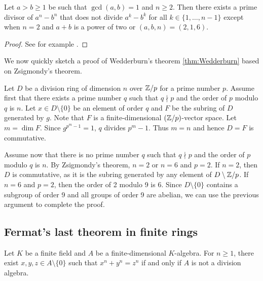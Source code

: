 
\begin{theorem}[Zsigmondy]
    Let $a>b\geq1$ be such that $\gcd(a,b)=1$ and $n\geq2$. 
    Then there exists a prime divisor of $a^n-b^n$ that does not
    divide $a^k-b^k$ for all $k\in\{1,\dots,n-1\}$ except 
    when $n=2$ and $a+b$ is a power of two or $(a,b,n)=(2,1,6)$. 
\end{theorem}


\begin{proof}
    See for example \cite{MR3172590}. 
\end{proof}

We now quickly sketch a proof of Wedderburn's theorem \ref{thm:Wedderburn} 
based on Zsigmondy's theorem.  

Let $D$ be a division ring of dimension $n$ over $\mathbb{Z}/p$ for a prime
number $p$. Assume 
first that there exists a prime number $q$ such that 
$q\nmid p$ and the order of $p$ modulo $q$ is $n$. Let $x\in D\setminus\{0\}$ be an element of order $q$ and $F$ be the subring
of $D$ generated by $g$. Note that $F$ is a finite-dimensional
$(\mathbb{Z}/p)$-vector space. Let $m=\dim F$. 
Since $g^{p^m-1}=1$, $q$ divides $p^m-1$. Thus $m=n$ and
hence $D=F$ is commutative. 

Assume now that there is no prime number $q$ such that 
$q\nmid p$ and the order of $p$ modulo $q$ is $n$. By Zsigmondy's 
theorem, $n=2$ or $n=6$ and $p=2$. If $n=2$, then 
$D$ is commutative, as it is the subring generated by
any element of $D\setminus \mathbb{Z}/p$. If $n=6$ and $p=2$, then 
the order of 2 modulo 9 is 6. Since $D\setminus\{0\}$ contains
a subgroup of order 9 and all groups of order 9 are abelian, 
we can use the previous argument to complete the proof. 


\subsection{Fermat's last theorem in finite rings}

\begin{theorem}
    Let $K$ be a finite field and $A$ be a finite-dimensional $K$-algebra.
    For $n\geq1$, there exist $x,y,z\in A\setminus\{0\}$ 
    such that $x^n+y^n=z^n$ if and only if 
    $A$ is not a division algebra.
\end{theorem}


